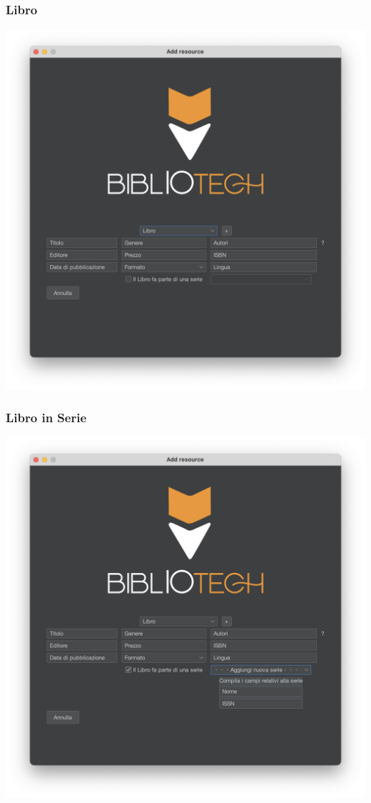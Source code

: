  \subsubsection{Libro}
 \includegraphics[scale=0.25, center]{Immagini/Schermate/Insert/InserisciRisorsaPage-Libro.png}
 \subsubsection{Libro in Serie}
 \includegraphics[scale=0.25, center]{Immagini/Schermate/Insert/InserisciRisorsaPage-LibroSerie.png}

